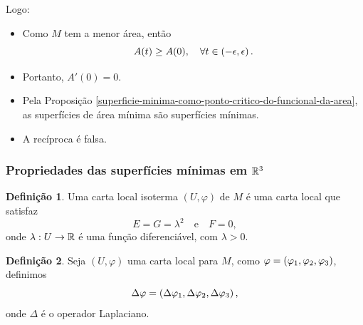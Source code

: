\documentclass[10pt,a4paper]{beamer}
\theoremstyle{definition}
\newtheorem{definicao}{Definição}
\begin{document}
\begin{frame}
	Logo:
	\begin{itemize}
		\item Como $M$ tem a menor área, então
		\begin{equation*}
		A(t) \geq A(0), \quad \forall t \in \left( -\epsilon,\epsilon \right).
		\end{equation*}
		\pause
		\item Portanto, $A'(0) = 0$.
		\pause
		\item Pela Proposição \ref{superficie-minima-como-ponto-critico-do-funcional-da-area}, \alert{as superfícies de área mínima são superfícies mínimas}.
		\pause
		\item A recíproca é falsa.
	\end{itemize}
\end{frame}

\begin{frame}
	\frametitle{Propriedades das superfícies mínimas em $\mathbb R^3$}
	
	\begin{definicao}
		Uma \alert{carta local isoterma} $(U, \varphi)$ de $M$ é uma carta local que satisfaz
		\begin{equation*}
		E = G = \lambda^2 \quad \text{e} \quad F=0,
		\end{equation*}
		onde $\lambda: U \rightarrow \mathbb R$ é uma função diferenciável, com $\lambda > 0$.
	\end{definicao}

	\pause
	
	\begin{definicao}
		Seja $(U, \varphi)$ uma carta local para $M$, como $\varphi = \left( \varphi_1, \varphi_2, \varphi_3 \right)$, definimos
		\begin{equation*}
		\Delta \varphi = \left( \Delta \varphi_1, \Delta \varphi_2, \Delta \varphi_3 \right),
		\end{equation*}
		onde $\Delta$ é o operador Laplaciano.
	\end{definicao}

\end{frame}
\end{document}
